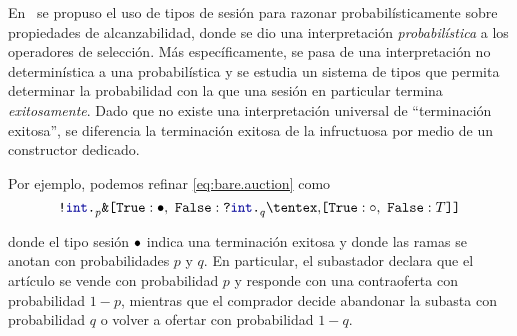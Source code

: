 En~\cite{DBLP:conf/concur/InversoMPTT20} se propuso el uso de tipos de sesión
para razonar probabilísticamente sobre propiedades de alcanzabilidad, donde se
dio una interpretación \emph{probabilística} a los operadores de selección. Más
específicamente, se pasa de una interpretación no determinística a una
probabilística y se estudia un sistema de tipos que permita determinar la
probabilidad con la que una sesión en particular termina \emph{exitosamente}.
Dado que no existe una interpretación universal de ``terminación exitosa'', se
diferencia la terminación exitosa de la infructuosa por medio de un constructor
dedicado.

Por ejemplo, podemos refinar \eqref{eq:bare.auction} como
\begin{equation}
    \label{eq:refined.auction}
    \Out\tint{
        \BinaryPBranch[p]\tdone{
            \In\tint{
                \BinaryPChoice[q]\tend\T
            }
        }
    }
\end{equation}

donde el tipo sesión ${\bullet}$ indica una terminación exitosa y donde las
ramas  se anotan con probabilidades $p$ y $q$. En particular, el subastador
declara que el artículo se vende con probabilidad $p$ y  responde con una
contraoferta con probabilidad $1-p$, mientras que el comprador decide abandonar
la subasta con probabilidad $q$ o volver a ofertar con probabilidad $1-q$.
